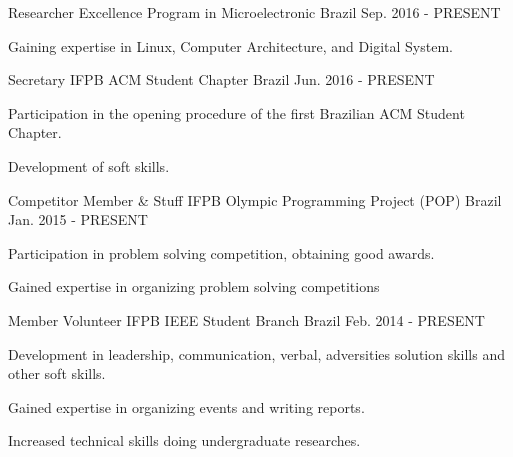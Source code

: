

\begin{cventries}

  \cventry
    {Researcher} %
    {Excellence Program in Microelectronic} %
    {Brazil} %
    {Sep. 2016 - PRESENT} %
    {
      \begin{cvitems} %
        \item {Gaining expertise in Linux, Computer Architecture, and Digital System.}
      \end{cvitems}
    }

  \cventry
    {Secretary} %
    {IFPB ACM Student Chapter} %
    {Brazil} %
    {Jun. 2016 - PRESENT} %
    {
      \begin{cvitems} %
        \item {Participation in the opening procedure of the first Brazilian ACM Student Chapter.}
        \item {Development of soft skills.}
      \end{cvitems}
    }
  \cventry
    {Competitor Member \& Stuff} %
    {IFPB Olympic Programming Project (POP)} %
    {Brazil} %
    {Jan. 2015 - PRESENT} %
    {
      \begin{cvitems} %
        \item {Participation in problem solving competition, obtaining good awards.}
        \item {Gained expertise in organizing problem solving competitions}
      \end{cvitems}
    }

  \cventry
    {Member Volunteer} %
    {IFPB IEEE Student Branch} %
    {Brazil} %
    {Feb. 2014 - PRESENT} %
    {
      \begin{cvitems} %
        \item {Development in leadership, communication, verbal, adversities solution skills and other soft skills.}
        \item {Gained expertise in organizing events and writing reports.}
        \item {Increased technical skills doing undergraduate researches.}
      \end{cvitems}
    }


\end{cventries}

